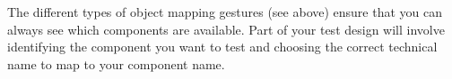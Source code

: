 The different types of object mapping gestures (see above) ensure that you can always see which components are available. Part of your test design will involve identifying the component you want to test and choosing the correct technical name to map to your component name. 

















